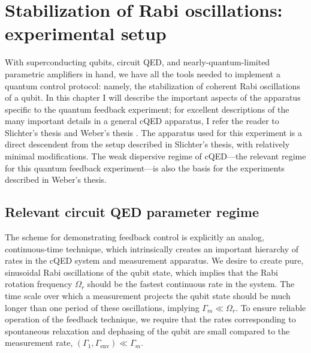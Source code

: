 
\chapter{Stabilization of Rabi oscillations: experimental setup}
\label{c:qfb}

With superconducting qubits, circuit QED, and nearly-quantum-limited parametric amplifiers in hand, we have all the tools needed to implement a quantum control protocol: namely, the stabilization of coherent Rabi oscillations of a qubit.  In this chapter I will describe the important aspects of the apparatus specific to the quantum feedback experiment; for excellent descriptions of the many important details in a general cQED apparatus, I refer the reader to Slichter's thesis \cite{slichterthesis} and Weber's thesis \cite{Weber2014a}.  The apparatus used for this experiment is a direct descendent from the setup described in Slichter's thesis, with relatively minimal modifications.  The weak dispersive regime of cQED---the relevant regime for this quantum feedback experiment---is also the basis for the experiments described in Weber's thesis.

\section{Relevant circuit QED parameter regime}

The scheme for demonstrating feedback control is explicitly an analog, continuous-time technique, which intrinsically creates an important hierarchy of rates in the cQED system and measurement apparatus.  We desire to create pure, sinusoidal Rabi oscillations of the qubit state, which implies that the Rabi rotation frequency $\Omega_r$ should be the fastest continuous rate in the system.  The time scale over which a measurement projects the qubit state should be much longer than one period of these oscillations, implying $\Gamma_m \ll \Omega_r$.  To ensure reliable operation of the feedback technique, we require that the rates corresponding to spontaneous relaxation and dephasing of the qubit are small compared to the measurement rate, $(\Gamma_1, \Gamma_\mathrm{env}) \ll \Gamma_m$.

